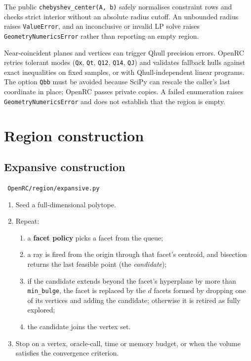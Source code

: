 \documentclass[11pt,a4paper]{report}
\newcommand{\trap}[1]{\begin{warnbox}#1\end{warnbox}}
\newcommand{\code}[1]{\texttt{\small #1}}
\newcommand{\file}[1]{\texttt{\small\color{nbgrey} #1}}
\begin{document}
The public \code{chebyshev\_center(A, b)} safely normalises constraint rows and
checks strict interior without an absolute radius cutoff. An unbounded radius
raises \code{ValueError}, and an inconclusive or invalid LP solve raises
\code{GeometryNumericsError} rather than reporting an empty region.

\trap{Near-coincident planes and vertices can trigger Qhull precision errors.
OpenRC retries tolerant modes (\code{Qx}, \code{Qt}, \code{Q12}, \code{Q14},
\code{QJ}) and validates fallback hulls against exact inequalities on fixed
samples, or with Qhull-independent linear programs. The option \code{Qbb}
must be avoided because SciPy can rescale the caller's last coordinate in
place; OpenRC passes private copies. A failed enumeration raises
\code{GeometryNumericsError} and does not establish that the region is empty.}

\chapter{Region construction}
\label{ch:construction}

\section{Expansive construction}

\file{OpenRC/region/expansive.py}

\begin{enumerate}
\item Seed a full-dimensional polytope.
\item Repeat:
  \begin{enumerate}
  \item a \textbf{facet policy} picks a facet from the queue;
  \item a ray is fired from the origin through that facet's centroid, and
    bisection returns the last feasible point (the \emph{candidate});
  \item if the candidate extends beyond the facet's hyperplane by more than
    \code{min\_bulge}, the facet is replaced by the $d$ facets formed by dropping
    one of its vertices and adding the candidate; otherwise it is retired as
    fully explored;
  \item the candidate joins the vertex set.
  \end{enumerate}
\item Stop on a vertex, oracle-call, time or memory budget, or when the volume
  satisfies the convergence criterion.
\end{enumerate}
\end{document}
